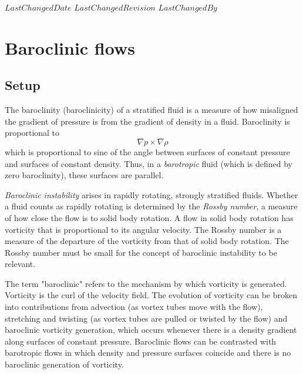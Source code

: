 {$LastChangedDate$}
{$LastChangedRevision$} {$LastChangedBy$}

\chapter{Baroclinic flows}
\label{chap:baroclinic}

\section{Setup}
\label{s:review}

The baroclinity (baroclinicity) of a stratified fluid is a measure of how
misaligned the gradient of pressure is from the gradient of density in a
fluid. Baroclinity is proportional to
\[
    \nabla p \times \nabla \rho
\]
which is proportional to sine of the angle between surfaces of constant
pressure and surfaces of constant density. Thus, in a \emph{barotropic} fluid
(which is defined by zero baroclinity), these surfaces are parallel.

\emph{Baroclinic instability} arises in rapidly rotating, strongly
stratified fluids. Whether a fluid counts as rapidly rotating is
determined by the \emph{Rossby number}, a measure of how close the flow
is to solid body rotation. A flow in solid body rotation has vorticity
that is proportional to its angular velocity. The Rossby number is a
measure of the departure of the vorticity from that of solid body
rotation. The Rossby number must be small for the concept of baroclinic
instability to be relevant.

The term "baroclinic" refers to the mechanism by which vorticity is
generated. Vorticity is the curl of the velocity field. The
evolution of vorticity can be broken into contributions from advection
(as vortex tubes move with the flow), stretching and twisting (as vortex
tubes are pulled or twisted by the flow) and baroclinic vorticity
generation, which occurs whenever there is a density gradient along
surfaces of constant pressure. Baroclinic flows can be contrasted with
barotropic flows in which density and pressure surfaces coincide and
there is no baroclinic generation of vorticity.


